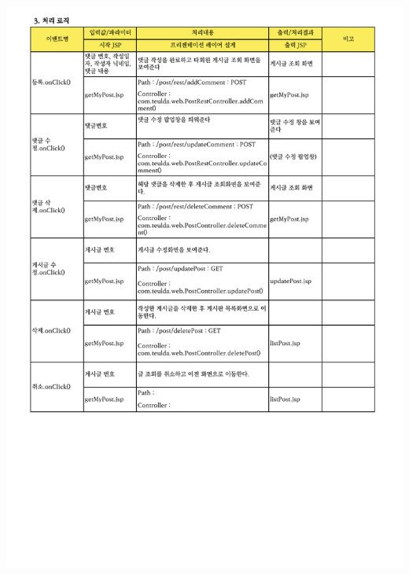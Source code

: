 {{{{{{{{{{{{{{{{{{{{{{{{{{{{{{{{{{{{{{{{{{{{{{{{{{{{{{{{{{{{{{{{{{\includegraphics[width=20cm]{./Figure/Design/Display/post/post_14.pdf} \\
}}}}}}}}}}}}}}}}}}}}}}}}}}}}}}}}}}}}}}}}}}}}}}}}}}}}}}}}}}}}}}}}}}
